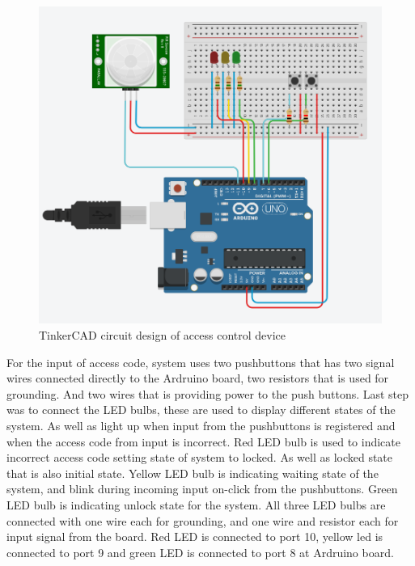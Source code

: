 \begin{figure}[h]
  \centering
  \includegraphics[scale=0.5]{figs/ACD_circut.png}
  \caption{TinkerCAD circuit design of access control device}
  \label{fig:framework}
\end{figure}
For the input of access code, system uses two pushbuttons that has two signal wires connected directly to the Ardruino board, two resistors that is used for grounding. And two wires that is providing power to the push buttons. Last step was to connect the LED bulbs, these are used to display different states of the system. As well as light up when input from the pushbuttons is registered and when the access code from input is incorrect. 
\newline\newline
Red LED bulb is used to indicate incorrect access code setting state of system to locked. As well as locked state that is also initial state. Yellow LED bulb is indicating waiting state of the system, and blink during incoming input on-click from the pushbuttons. Green LED bulb is indicating unlock state for the system. All three LED bulbs are connected with one wire each for grounding, and one wire and resistor each for input signal from the board. Red LED is connected to port 10, yellow led is connected to port 9 and green LED is connected to port 8 at Ardruino board. 

